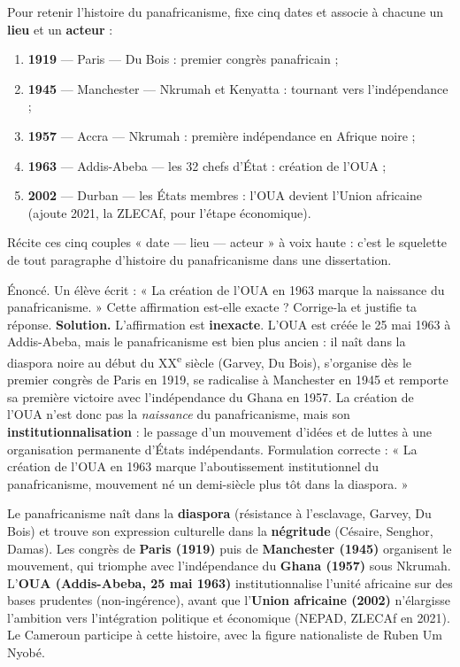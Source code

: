 \documentclass[11pt]{article}
\begin{document}
\begin{methode}
Pour retenir l'histoire du panafricanisme, fixe cinq dates et associe à chacune un \textbf{lieu} et un \textbf{acteur} :
\begin{enumerate}
\item \textbf{1919} — Paris — Du Bois : premier congrès panafricain ;
\item \textbf{1945} — Manchester — Nkrumah et Kenyatta : tournant vers l'indépendance ;
\item \textbf{1957} — Accra — Nkrumah : première indépendance en Afrique noire ;
\item \textbf{1963} — Addis-Abeba — les 32 chefs d'État : création de l'OUA ;
\item \textbf{2002} — Durban — les États membres : l'OUA devient l'Union africaine (ajoute 2021, la ZLECAf, pour l'étape économique).
\end{enumerate}
Récite ces cinq couples « date — lieu — acteur » à voix haute : c'est le squelette de tout paragraphe d'histoire du panafricanisme dans une dissertation.
\end{methode}

\begin{exoresolu}
Énoncé. Un élève écrit : « La création de l'OUA en 1963 marque la naissance du panafricanisme. » Cette affirmation est-elle exacte ? Corrige-la et justifie ta réponse.
\tcblower
\textbf{Solution.} L'affirmation est \textbf{inexacte}. L'OUA est créée le 25 mai 1963 à Addis-Abeba, mais le panafricanisme est bien plus ancien : il naît dans la diaspora noire au début du XX\textsuperscript{e} siècle (Garvey, Du Bois), s'organise dès le premier congrès de Paris en 1919, se radicalise à Manchester en 1945 et remporte sa première victoire avec l'indépendance du Ghana en 1957. La création de l'OUA n'est donc pas la \emph{naissance} du panafricanisme, mais son \textbf{institutionnalisation} : le passage d'un mouvement d'idées et de luttes à une organisation permanente d'États indépendants. Formulation correcte : « La création de l'OUA en 1963 marque l'aboutissement institutionnel du panafricanisme, mouvement né un demi-siècle plus tôt dans la diaspora. »
\end{exoresolu}

\begin{aretenir}
Le panafricanisme naît dans la \textbf{diaspora} (résistance à l'esclavage, Garvey, Du Bois) et trouve son expression culturelle dans la \textbf{négritude} (Césaire, Senghor, Damas). Les congrès de \textbf{Paris (1919)} puis de \textbf{Manchester (1945)} organisent le mouvement, qui triomphe avec l'indépendance du \textbf{Ghana (1957)} sous Nkrumah. L'\textbf{OUA (Addis-Abeba, 25 mai 1963)} institutionnalise l'unité africaine sur des bases prudentes (non-ingérence), avant que l'\textbf{Union africaine (2002)} n'élargisse l'ambition vers l'intégration politique et économique (NEPAD, ZLECAf en 2021). Le Cameroun participe à cette histoire, avec la figure nationaliste de Ruben Um Nyobé.
\end{aretenir}
\end{document}
